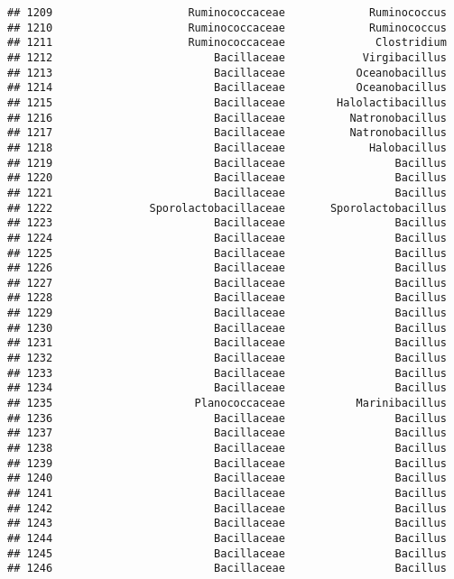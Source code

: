 \documentclass[
]{article}
\begin{document}
\begin{verbatim}
## 1209                     Ruminococcaceae             Ruminococcus
## 1210                     Ruminococcaceae             Ruminococcus
## 1211                     Ruminococcaceae              Clostridium
## 1212                         Bacillaceae            Virgibacillus
## 1213                         Bacillaceae           Oceanobacillus
## 1214                         Bacillaceae           Oceanobacillus
## 1215                         Bacillaceae        Halolactibacillus
## 1216                         Bacillaceae          Natronobacillus
## 1217                         Bacillaceae          Natronobacillus
## 1218                         Bacillaceae             Halobacillus
## 1219                         Bacillaceae                 Bacillus
## 1220                         Bacillaceae                 Bacillus
## 1221                         Bacillaceae                 Bacillus
## 1222               Sporolactobacillaceae       Sporolactobacillus
## 1223                         Bacillaceae                 Bacillus
## 1224                         Bacillaceae                 Bacillus
## 1225                         Bacillaceae                 Bacillus
## 1226                         Bacillaceae                 Bacillus
## 1227                         Bacillaceae                 Bacillus
## 1228                         Bacillaceae                 Bacillus
## 1229                         Bacillaceae                 Bacillus
## 1230                         Bacillaceae                 Bacillus
## 1231                         Bacillaceae                 Bacillus
## 1232                         Bacillaceae                 Bacillus
## 1233                         Bacillaceae                 Bacillus
## 1234                         Bacillaceae                 Bacillus
## 1235                      Planococcaceae           Marinibacillus
## 1236                         Bacillaceae                 Bacillus
## 1237                         Bacillaceae                 Bacillus
## 1238                         Bacillaceae                 Bacillus
## 1239                         Bacillaceae                 Bacillus
## 1240                         Bacillaceae                 Bacillus
## 1241                         Bacillaceae                 Bacillus
## 1242                         Bacillaceae                 Bacillus
## 1243                         Bacillaceae                 Bacillus
## 1244                         Bacillaceae                 Bacillus
## 1245                         Bacillaceae                 Bacillus
## 1246                         Bacillaceae                 Bacillus

\end{verbatim}
\end{document}
